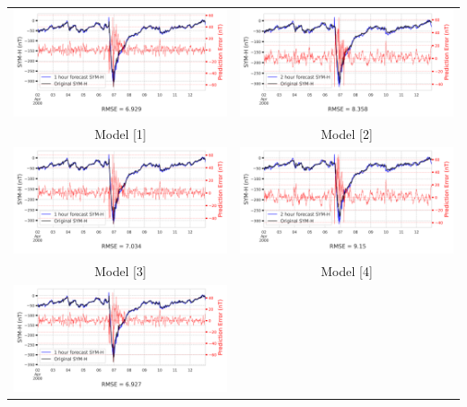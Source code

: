 \documentclass[draft,sw]{agutexSI2019}
\begin{document}
\begin{table}
\centering
\begin{tabular}{cc}
\includegraphics[width=0.49\linewidth]{paper_plots/1h_swics/1h_swics_storm_31.png}
&
\includegraphics[width=0.49\linewidth]{paper_plots/2h_swics/2h_swics_storm_31.png}
\\
Model [1] & Model [2]
\vspace*{12pt}
\\
\includegraphics[width=0.49\linewidth]{paper_plots/1h_no_swics/1h_no_swics_storm_31.png}
&
\includegraphics[width=0.49\linewidth]{paper_plots/2h_no_swics/2h_no_swics_storm_31.png}
\\
Model [3] & Model [4]
\vspace*{12pt}
\\
\includegraphics[width=0.49\linewidth]{paper_plots/1h_swics_model_on_no_swics/1h_swics_model_on_no_swics_storm_31.png}

\end{tabular}
\end{table}
\end{document}
